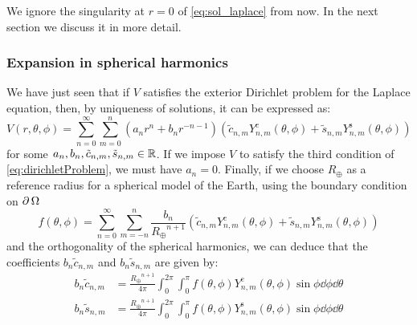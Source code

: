 \documentclass[../main.tex]{subfiles}
\begin{document}
We ignore the singularity at $r=0$ of \cref{eq:sol_laplace} from now. In the next section we discuss it in more detail.
\subsubsection{Expansion in spherical harmonics}\label{sec:laplace_spherical_potential}
We have just seen that if $V$ satisfies the exterior Dirichlet problem for the Laplace equation, then, by uniqueness of solutions, it can be expressed as:
\begin{equation}\label{eq:prePotential}
  V(r,\theta,\phi) = \sum_{n=0}^\infty \sum_{m=0}^n (a_n r^{n} +b_{n}r^{-n-1})(\tilde{c}_{n,m}Y_{n,m}^{\mathrm{c}}(\theta,\phi)+\tilde{s}_{n,m}Y_{n,m}^{\mathrm{s}}(\theta,\phi))
\end{equation}
for some $a_n,b_n,\tilde{c}_{n,m},\tilde{s}_{n,m}\in\mathbb{R}$. If we impose $V$ to satisfy the third condition of \cref{eq:dirichletProblem}, we must have $a_{n}=0$.
Finally, if we choose $R_\oplus$ as a reference radius for a spherical model of the Earth, using the boundary condition on $\operatorname{\partial}{\Omega}$
\begin{equation}
  f(\theta,\phi) = \sum_{n=0}^\infty \sum_{m=-n}^n \frac{b_{n}}{{R_\oplus}^{n+1}}(\tilde{c}_{n,m}Y_{n,m}^{\mathrm{c}}(\theta,\phi)+\tilde{s}_{n,m}Y_{n,m}^{\mathrm{s}}(\theta,\phi))
\end{equation}
and the orthogonality of the spherical harmonics, we can deduce that the coefficients $b_n\tilde{c}_{n,m}$ and $b_n\tilde{s}_{n,m}$ are given by:
\begin{align}
  b_n\tilde{c}_{n,m} & =\frac{{R_\oplus}^{n+1}}{4\pi}\int_0^{2\pi}\int_0^\pi f(\theta,\phi) Y_{n,m}^\mathrm{c}(\theta,\phi)\sin\phi\dd{\phi}\dd{\theta} \\
  b_n\tilde{s}_{n,m} & =\frac{{R_\oplus}^{n+1}}{4\pi}\int_0^{2\pi}\int_0^\pi f(\theta,\phi) Y_{n,m}^\mathrm{s}(\theta,\phi)\sin\phi\dd{\phi}\dd{\theta}
\end{align}
\end{document}
